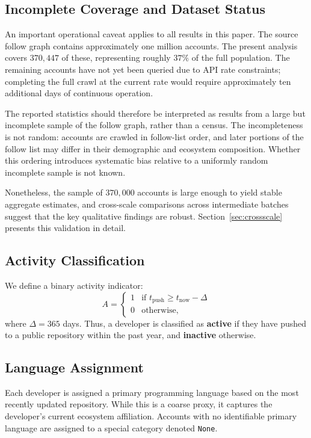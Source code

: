\documentclass[12pt,a4paper]{article}
\begin{document}
\subsection{Incomplete Coverage and Dataset Status}

An important operational caveat applies to all results in this paper. The source follow graph contains approximately one million accounts. The present analysis covers $370{,}447$ of these, representing roughly $37\%$ of the full population. The remaining accounts have not yet been queried due to API rate constraints; completing the full crawl at the current rate would require approximately ten additional days of continuous operation.

The reported statistics should therefore be interpreted as results from a large but incomplete sample of the follow graph, rather than a census. The incompleteness is not random: accounts are crawled in follow-list order, and later portions of the follow list may differ in their demographic and ecosystem composition. Whether this ordering introduces systematic bias relative to a uniformly random incomplete sample is not known.

Nonetheless, the sample of $370{,}000$ accounts is large enough to yield stable aggregate estimates, and cross-scale comparisons across intermediate batches suggest that the key qualitative findings are robust. Section~\ref{sec:crossscale} presents this validation in detail.

\subsection{Activity Classification}

We define a binary activity indicator:
\[
A =
\begin{cases}
1 & \text{if } t_{\text{push}} \geq t_{\text{now}} - \Delta \\
0 & \text{otherwise,}
\end{cases}
\]
where $\Delta = 365$ days. Thus, a developer is classified as \textbf{active} if they have pushed to a public repository within the past year, and \textbf{inactive} otherwise.

\subsection{Language Assignment}

Each developer is assigned a primary programming language based on the most recently updated repository. While this is a coarse proxy, it captures the developer's current ecosystem affiliation. Accounts with no identifiable primary language are assigned to a special category denoted \texttt{None}.
\end{document}
